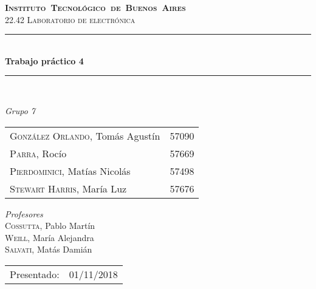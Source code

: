 \begin{titlepage}
\newcommand{\HRule}{\rule{\linewidth}{0.5mm}}
\center
\mbox{\textsc{\LARGE \bfseries {Instituto Tecnol\'ogico de Buenos Aires}}}\\[1.5cm]
\textsc{\Large 22.42 Laboratorio de electr\'onica}\\[0.5cm]


\HRule \\[0.6cm]
{ \Huge \bfseries Trabajo pr\'actico 4}\\[0.4cm] %
\HRule \\[1.5cm]


{\large

\emph{Grupo 7}\\
\vspace{3px}

\begin{tabular}{lr} 	
\textsc{Gonz\'alez Orlando}, Tom\'as Agust\'in  & 57090 \\
\textsc{Parra}, Roc\'io  & 57669 \\ 	
\textsc{Pierdominici}, Mat\'ias Nicol\'as & 57498 \\     
\textsc{Stewart Harris}, Mar\'ia Luz  & 57676 	
\end{tabular}

\vspace{20px}

\emph{Profesores}\\
\vspace{3px}
\textsc{Cossutta,} Pablo Mart\'in \\ 	
\textsc{Weill,} Mar\'ia Alejandra \\
\textsc{Salvati,} Mat\'as Dami\'an \\

\vspace{100px}

\begin{tabular}{ll}

Presentado: & 01/11/2018\\

\end{tabular}

}

\vfill

\end{titlepage}